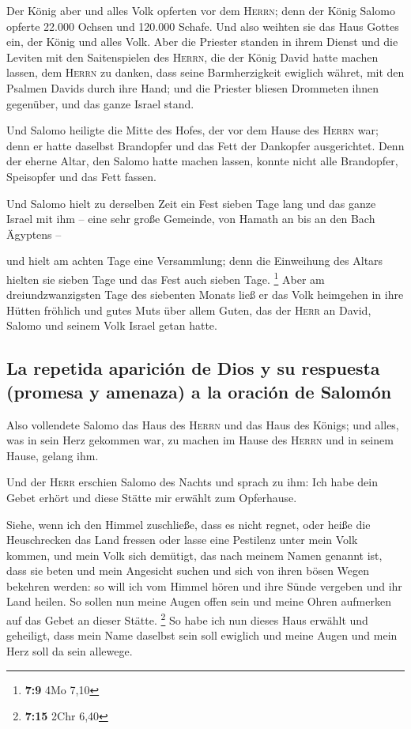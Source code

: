  Der König aber und alles Volk opferten vor dem
\textsc{Herrn};  denn der König Salomo opferte 22.000
Ochsen und 120.000 Schafe. Und also weihten sie das Haus Gottes ein, der
König und alles Volk.  Aber die Priester standen in ihrem
Dienst und die Leviten mit den Saitenspielen des \textsc{Herrn}, die der
König David hatte machen lassen, dem \textsc{Herrn} zu danken, dass
seine Barmherzigkeit ewiglich währet, mit den Psalmen Davids durch ihre
Hand; und die Priester bliesen Drommeten ihnen gegenüber, und das ganze
Israel stand.

 Und Salomo heiligte die Mitte des Hofes, der vor dem
Hause des \textsc{Herrn} war; denn er hatte daselbst Brandopfer und das
Fett der Dankopfer ausgerichtet. Denn der eherne Altar, den Salomo hatte
machen lassen, konnte nicht alle Brandopfer, Speisopfer und das Fett
fassen.

 Und Salomo hielt zu derselben Zeit ein Fest sieben Tage
lang und das ganze Israel mit ihm -- eine sehr große Gemeinde, von
Hamath an bis an den Bach Ägyptens --

 und hielt am achten Tage eine Versammlung; denn die
Einweihung des Altars hielten sie sieben Tage und das Fest auch sieben
Tage. \footnote{\textbf{7:9} 4Mo 7,10}  Aber am
dreiundzwanzigsten Tage des siebenten Monats ließ er das Volk heimgehen
in ihre Hütten fröhlich und gutes Muts über allem Guten, das der
\textsc{Herr} an David, Salomo und seinem Volk Israel getan hatte.

\hypertarget{la-repetida-apariciuxf3n-de-dios-y-su-respuesta-promesa-y-amenaza-a-la-oraciuxf3n-de-salomuxf3n}{%
\subsection{La repetida aparición de Dios y su respuesta (promesa y
amenaza) a la oración de
Salomón}\label{la-repetida-apariciuxf3n-de-dios-y-su-respuesta-promesa-y-amenaza-a-la-oraciuxf3n-de-salomuxf3n}}

 Also vollendete Salomo das Haus des \textsc{Herrn} und
das Haus des Königs; und alles, was in sein Herz gekommen war, zu machen
im Hause des \textsc{Herrn} und in seinem Hause, gelang ihm.

 Und der \textsc{Herr} erschien Salomo des Nachts und
sprach zu ihm: Ich habe dein Gebet erhört und diese Stätte mir erwählt
zum Opferhause.

 Siehe, wenn ich den Himmel zuschließe, dass es nicht
regnet, oder heiße die Heuschrecken das Land fressen oder lasse eine
Pestilenz unter mein Volk kommen,  und mein Volk sich
demütigt, das nach meinem Namen genannt ist, dass sie beten und mein
Angesicht suchen und sich von ihren bösen Wegen bekehren werden: so will
ich vom Himmel hören und ihre Sünde vergeben und ihr Land heilen.
 So sollen nun meine Augen offen sein und meine Ohren
aufmerken auf das Gebet an dieser Stätte. \footnote{\textbf{7:15} 2Chr
  6,40}  So habe ich nun dieses Haus erwählt und
geheiligt, dass mein Name daselbst sein soll ewiglich und meine Augen
und mein Herz soll da sein allewege.

